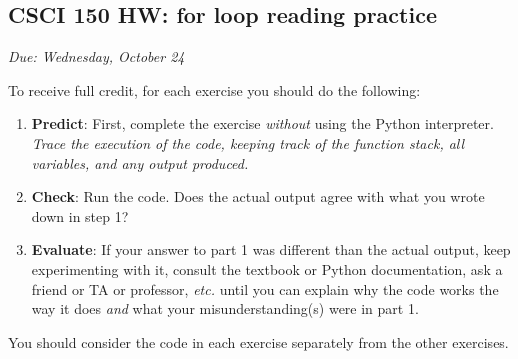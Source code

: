 \documentclass[]{article}
\date{}
\begin{document}
\subsection{CSCI 150 HW: for loop reading
practice}\label{csci-150-hw-for-loop-reading-practice}

\emph{Due: Wednesday, October 24}

To receive full credit, for each exercise you should do the following:

\begin{enumerate}
\def\labelenumi{\arabic{enumi}.}
\item
  \textbf{Predict}: First, complete the exercise \emph{without} using
  the Python interpreter. \emph{Trace the execution of the code, keeping
  track of the function stack, all variables, and any output produced.}
\item
  \textbf{Check}: Run the code. Does the actual output agree with what
  you wrote down in step 1?
\item
  \textbf{Evaluate}: If your answer to part 1 was different than the
  actual output, keep experimenting with it, consult the textbook or
  Python documentation, ask a friend or TA or professor, \emph{etc.}
  until you can explain why the code works the way it does \emph{and}
  what your misunderstanding(s) were in part 1.
\end{enumerate}

You should consider the code in each exercise separately from the other
exercises.
\end{document}
